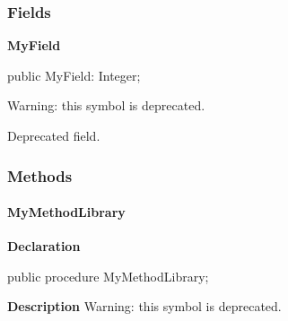 \documentclass{report}
\newif\ifpdf
\begin{document}
\subsubsection*{\large{\textbf{Fields}}\normalsize\hspace{1ex}\hfill}
\begin{list}{}{
\setlength{\itemindent}{0cm}
\setlength{\listparindent}{0cm}
\setlength{\leftmargin}{\evensidemargin}
\addtolength{\leftmargin}{\tmplength}
\settowidth{\labelsep}{X}
\addtolength{\leftmargin}{\labelsep}
\setlength{\labelwidth}{\tmplength}
}
\label{ok_deprecated_tag.TMyClass-MyField}
\item[\textbf{MyField}\hfill]
\ifpdf
\begin{flushleft}
\fi
\begin{ttfamily}
public MyField: Integer;\end{ttfamily}

\ifpdf
\end{flushleft}
\fi


\par Warning: this symbol is deprecated.

Deprecated field. \end{list}
\subsubsection*{\large{\textbf{Methods}}\normalsize\hspace{1ex}\hfill}
\paragraph*{MyMethodLibrary}\hspace*{\fill}

\label{ok_deprecated_tag.TMyClass-MyMethodLibrary}
\begin{list}{}{
\setlength{\itemindent}{0cm}
\setlength{\listparindent}{0cm}
\setlength{\leftmargin}{\evensidemargin}
\addtolength{\leftmargin}{\tmplength}
\settowidth{\labelsep}{X}
\addtolength{\leftmargin}{\labelsep}
\setlength{\labelwidth}{\tmplength}
}
\item[\textbf{Declaration}\hfill]
\ifpdf
\begin{flushleft}
\fi
\begin{ttfamily}
public procedure MyMethodLibrary;\end{ttfamily}

\ifpdf
\end{flushleft}
\fi

\par
\item[\textbf{Description}]
Warning: this symbol is deprecated.

 

\end{list}
\end{document}
